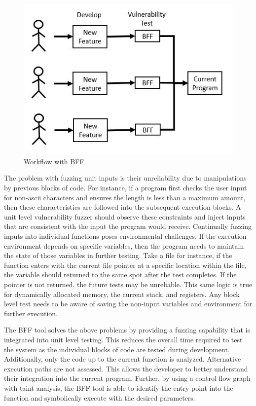 \documentclass[conference]{IEEEtran}
\begin{document}
\begin{figure}
  \includegraphics[width=\linewidth]{SDLC_BFF.JPG}
  \caption{Workflow with BFF}
  \label{fig:SLDC_BFF}
\end{figure}

The problem with fuzzing unit inputs is their unreliability due to manipulations by previous blocks of code. For instance, if a program first checks the user input for non-ascii characters and ensures the length is less than a maximum amount, then these characteristics are followed into the subsequent execution blocks. A unit level vulnerability fuzzer should observe these constraints and inject inputs that are consistent with the input the program would receive. Continually fuzzing inputs into individual functions poses environmental challenges. If the execution environment depends on specific variables, then the program needs to maintain the state of those variables in further testing. Take a file for instance, if the function enters with the current file pointer at a specific location within the file, the variable should returned to the same spot after the test completes. If the pointer is not returned, the future tests may be unreliable. This same logic is true for dynamically allocated memory, the current stack, and registers. Any block level test needs to be aware of saving the non-input variables and environment for further execution.

The BFF tool solves the above problems by providing a fuzzing capability that is integrated into unit level testing. This reduces the overall time required to test the system as the individual blocks of code are tested during development. Additionally, only the code up to the current function is analyzed. Alternative execution paths are not assessed. This allows the developer to better understand their integration into the current program. Further, by using a control flow graph with taint analysis, the BFF tool is able to identify the entry point into the function and symbolically execute with the desired parameters. 
\end{document}
